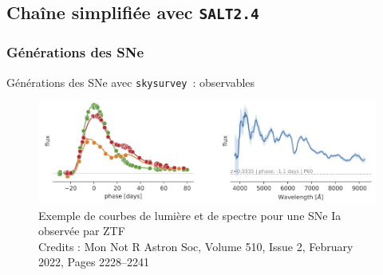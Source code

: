 \documentclass{beamer}
\def\skysurvey{\texttt{skysurvey}\xspace}
\def\saltd{\texttt{SALT2.4}\xspace}
\newcommand{\credits}[1]{\tiny Credits : #1}
\begin{document}
\subsection{Chaîne simplifiée avec \saltd}

\subsubsection{Générations des SNe}

\begin{frame}{Générations des SNe avec \skysurvey~: observables}
\begin{figure}
	\centering
	\includegraphics[width=.9\textwidth]{figures/exemple_lc_sp.png}
	\caption{Exemple de courbes de lumière et de spectre pour une SNe Ia observée par ZTF\\ \credits{Mon Not R Astron Soc, Volume 510, Issue 2, February 2022, Pages 2228–2241}}
\end{figure}
\end{frame}

\end{document}
